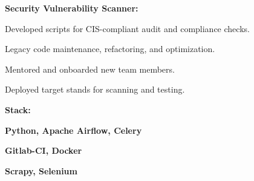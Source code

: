 \documentclass[a4paper]{MagicalCV}
\begin{document}
\begin{minipage}[t]{0.64\textwidth}
\textbf{Security Vulnerability Scanner:}
\begin{tightemize}
  \item Developed scripts for CIS-compliant audit and compliance checks.
  \item Legacy code maintenance, refactoring, and optimization.
  \item Mentored and onboarded new team members.
  \item Deployed target stands for scanning and testing.
\end{tightemize}

\textbf{Stack:}
\begin{tightemize}
  \item \textbf{Python, Apache Airflow, Celery}
  \item \textbf{Gitlab-CI, Docker}
  \item \textbf{Scrapy, Selenium}
\end{tightemize}
\sectionsep

\end{minipage} 
\end{document}
